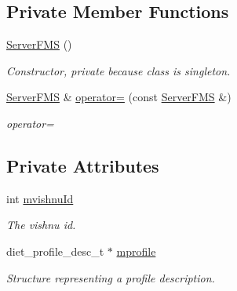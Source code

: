 \subsection*{Private Member Functions}
\begin{DoxyCompactItemize}
\item 
\hypertarget{classServerFMS_a2c3c7d94e01d66f2397ff1671a856f6a}{
\hyperlink{classServerFMS_a2c3c7d94e01d66f2397ff1671a856f6a}{ServerFMS} ()}
\label{classServerFMS_a2c3c7d94e01d66f2397ff1671a856f6a}

\begin{DoxyCompactList}\small\item\em Constructor, private because class is singleton. \item\end{DoxyCompactList}\item 
\hypertarget{classServerFMS_a87c7ee357b2517387d24f2fbdb90a6a0}{
\hyperlink{classServerFMS}{ServerFMS} \& \hyperlink{classServerFMS_a87c7ee357b2517387d24f2fbdb90a6a0}{operator=} (const \hyperlink{classServerFMS}{ServerFMS} \&)}
\label{classServerFMS_a87c7ee357b2517387d24f2fbdb90a6a0}

\begin{DoxyCompactList}\small\item\em operator= \item\end{DoxyCompactList}\end{DoxyCompactItemize}
\subsection*{Private Attributes}
\begin{DoxyCompactItemize}
\item 
\hypertarget{classServerFMS_ae477ef9394a0249ed967e6d1527fb359}{
int \hyperlink{classServerFMS_ae477ef9394a0249ed967e6d1527fb359}{mvishnuId}}
\label{classServerFMS_ae477ef9394a0249ed967e6d1527fb359}

\begin{DoxyCompactList}\small\item\em The vishnu id. \item\end{DoxyCompactList}\item 
\hypertarget{classServerFMS_a46b055356f61dba7ac31de38631fa0ad}{
diet\_\-profile\_\-desc\_\-t $\ast$ \hyperlink{classServerFMS_a46b055356f61dba7ac31de38631fa0ad}{mprofile}}
\label{classServerFMS_a46b055356f61dba7ac31de38631fa0ad}

\begin{DoxyCompactList}\small\item\em Structure representing a profile description. \item\end{DoxyCompactList}\end{DoxyCompactItemize}
